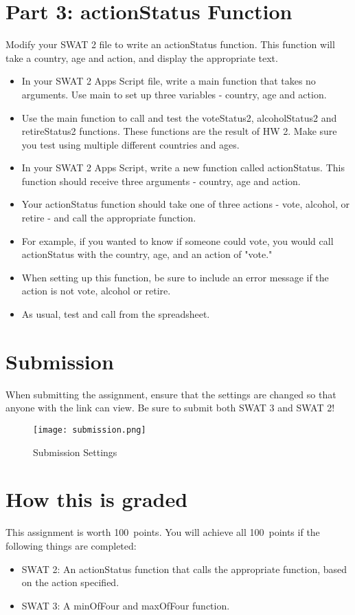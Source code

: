\documentclass{article}
\newcommand{\AValue}{100}
\begin{document}
\section*{Part 3: actionStatus Function}
Modify your SWAT 2 file to write an actionStatus function.  This function will take a country, age and action, and display the appropriate text.
\begin{itemize}
	\item In your SWAT 2 Apps Script file, write a main function that takes no arguments.  Use main to set up three variables - country, age and action.
	\item Use the main function to call and test the voteStatus2, alcoholStatus2 and retireStatus2 functions.  These functions are the result of HW 2.  Make sure you test using multiple different countries and ages.
	\item In your SWAT 2 Apps Script, write a new function called actionStatus. This function should receive three arguments - country, age and action.
	\item Your actionStatus function should take one of three actions - vote, alcohol, or retire - and call the appropriate function.
	\item For example, if you wanted to know if someone could vote, you would call actionStatus with the country, age, and an action of "vote."
	\item When setting up this function, be sure to include an error message if the action is not vote, alcohol or retire. 
	\item As usual, test and call from the spreadsheet.
\end{itemize}

\section*{Submission}
When submitting the assignment, ensure that the settings are changed so that anyone with the link can view.  Be sure to submit both SWAT 3 and SWAT 2!
\begin{figure}[H]
  \centering
  \texttt{[image: submission.png]}
  \caption{Submission Settings}
\end{figure}

\section*{How this is graded}
This assignment is worth \AValue \ points. You will achieve all \AValue \   points if the following things are completed:
\begin{itemize}
    \item SWAT 2:  An actionStatus function that calls the appropriate function, based on the action specified.
    \item SWAT 3:  A minOfFour and maxOfFour function.
\end{itemize}
\end{document}
